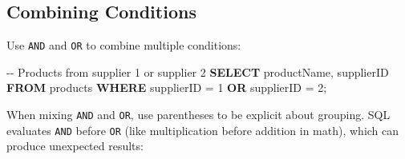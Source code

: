 \documentclass[
  letterpaper,
  DIV=11,
  numbers=noendperiod]{scrreprt}
\newenvironment{Shaded}{\begin{snugshade}}{\end{snugshade}}
\newcommand{\CommentTok}[1]{\textcolor[rgb]{0.37,0.37,0.37}{#1}}
\newcommand{\DecValTok}[1]{\textcolor[rgb]{0.68,0.00,0.00}{#1}}
\newcommand{\KeywordTok}[1]{\textcolor[rgb]{0.00,0.23,0.31}{\textbf{#1}}}
\newcommand{\NormalTok}[1]{\textcolor[rgb]{0.00,0.23,0.31}{#1}}
\newcommand{\OperatorTok}[1]{\textcolor[rgb]{0.37,0.37,0.37}{#1}}
\begin{document}
\subsection{Combining Conditions}\label{combining-conditions}

Use \texttt{AND} and \texttt{OR} to combine multiple conditions:

\begin{codelisting}

\caption{\texttt{duckdb}}

\begin{Shaded}
\end{Shaded}

\end{codelisting}

\begin{codelisting}

\caption{\texttt{duckdb}}

\begin{Shaded}
\begin{Highlighting}[]
\CommentTok{{-}{-} Products from supplier 1 or supplier 2}
\KeywordTok{SELECT}
\NormalTok{    productName,}
\NormalTok{    supplierID}
\KeywordTok{FROM}\NormalTok{ products}
\KeywordTok{WHERE}\NormalTok{ supplierID }\OperatorTok{=} \DecValTok{1}
   \KeywordTok{OR}\NormalTok{ supplierID }\OperatorTok{=} \DecValTok{2}\NormalTok{;}
\end{Highlighting}
\end{Shaded}

\end{codelisting}

When mixing \texttt{AND} and \texttt{OR}, use parentheses to be explicit
about grouping. SQL evaluates \texttt{AND} before \texttt{OR} (like
multiplication before addition in math), which can produce unexpected
results:
\end{document}
